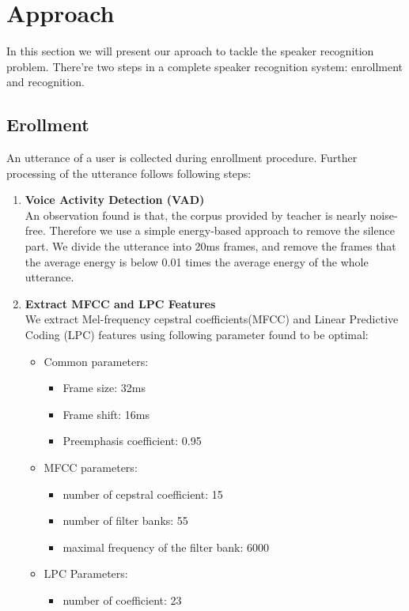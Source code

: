 \section{Approach}
	In this section we will present our aproach to tackle the speaker recognition problem.
	There're two steps in a complete speaker recognition system: enrollment and recognition.
\subsection{Erollment}
	\label{sec:approach_enrollment}
	An utterance of a user is collected during enrollment procedure.
	Further processing of the utterance follows following steps:
	\begin{enumerate}
		\item \textbf{Voice Activity Detection (VAD)} \\
			An observation found is that, the corpus provided by teacher is
			nearly noise-free. Therefore we use a simple energy-based approach
			to remove the silence part. We divide the utterance into 20ms frames,
			and remove the frames that the average energy is below 0.01 times
			the average energy of the whole utterance.

		\item \textbf{Extract MFCC and LPC Features} \\ We extract
			Mel-frequency cepstral coefficients(MFCC) and Linear Predictive
			Coding (LPC) features using following parameter found to be
			optimal:

			\begin{itemize}
				\item Common parameters:
					\begin{itemize}
						\item Frame size: 32ms
						\item Frame shift: 16ms
						\item Preemphasis coefficient: 0.95
					\end{itemize}
				\item MFCC parameters:
					\begin{itemize}
						\item number of cepstral coefficient: 15
						\item number of filter banks: 55
						\item maximal frequency of the filter bank: 6000
					\end{itemize}
				\item LPC Parameters:
					\begin{itemize}
						\item number of coefficient: 23
					\end{itemize}
			\end{itemize}


\end{enumerate}
